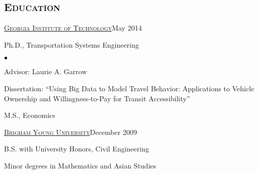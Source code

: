 \documentclass[margin,line]{res}
\newenvironment{list1}{
  \begin{list}{\ding{113}}{%
      \setlength{\itemsep}{0in}
      \setlength{\parsep}{0in} \setlength{\parskip}{0in}
      \setlength{\topsep}{0in} \setlength{\partopsep}{0in}
      \setlength{\leftmargin}{0.17in}}}{\end{list}}
\newenvironment{list2}{
  \begin{list}{$\bullet$}{%
      \setlength{\itemsep}{0in}
      \setlength{\parsep}{0in} \setlength{\parskip}{0in}
      \setlength{\topsep}{0in} \setlength{\partopsep}{0in}
      \setlength{\leftmargin}{0.2in}}}{\end{list}}
\newcommand{\secfont}{\scshape }
\newcommand{\acc}{\scshape }
\begin{document}
\begin{resume}
\noindent\makebox[\linewidth]{\rule{\linewidth}{0.4pt}}
\section{\secfont Education}
\href{http://www.gatech.edu}{\acc Georgia Institute of Technology}\hfill{May 2014}
\\
	\vspace*{-.1in}
	\begin{list1}
	\item[] Ph.D., Transportation Systems Engineering
	\begin{list2}
  	\item[] Advisor: Laurie A. Garrow
		\item[] Dissertation: ``Using Big Data to Model Travel Behavior: Applications to Vehicle Ownership and Willingness-to-Pay for Transit Accessibility''
  \end{list2}
	\vspace*{.05in}
	\item[]M.S., Economics
	\end{list1}

\href{http://www.byu.edu}{\acc Brigham Young University}\hfill{December 2009}
\\
\vspace*{-.1in}
\begin{list1}
  \item[] B.S. with University Honors, Civil Engineering
	\item[] Minor	degrees in Mathematics and Asian Studies
\end{list1}


\end{resume}
\end{document}
